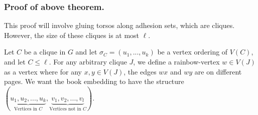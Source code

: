 \documentclass[]{report}
\theoremstyle{definition}
\numberwithin{theorem}{section}
\numberwithin{equation}{section}
\begin{document}
\subsubsection{Proof of above theorem.}
This proof will involve gluing torsos along adhesion sets, which are cliques. However, the size of these cliques is at most $\ell$. 

Let $C$ be a clique in $G$ and let $\sigma_C = (u_1, ... , u_k)$ be a vertex ordering of $V(C)$, and let $C \leq \ell$. For any arbitrary clique $J$, we define a rainbow-vertex $w \in V(J)$ as a vertex where for any $x, y \in V(J)$, the edges $wx$ and $wy$ are on different pages. We want the book embedding to have the structure $(\underbrace{u_1, u_2, ..., u_k}_{\text{Vertices in } C}, \underbrace{v_1, v_2, ..., v_l}_{\text{Vertices not in }C})$. 
\end{document}
